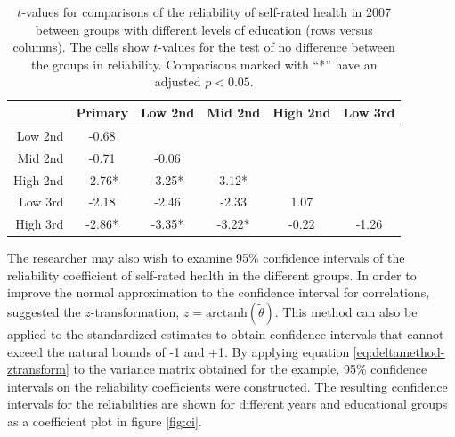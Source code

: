 \documentclass[a4paper,11pt]{article}
\newcommand{\thetastan}{\tilde{\theta}}
\newcommand{\0}{\boldsymbol{0}}
\newcommand{\arctanh}{\mathrm{arctanh}}
\begin{document}
\begin{table}[tbh]
\begin{center}
\begin{tabular}{rccccc}
  \hline
 & Primary & Low 2nd & Mid 2nd & High 2nd & Low 3rd \\
   \hline
  Low 2nd & -0.68 \\ 
  Mid 2nd & -0.71 & -0.06  \\ 
  High 2nd & -2.76* & -3.25* &3.12*   \\ 
  Low 3rd & -2.18 & -2.46 & -2.33 & 1.07   \\ 
  High 3rd & -2.86* & -3.35* & -3.22* & -0.22 & -1.26  \\ 
   \hline
\end{tabular}\caption{$t$-values for comparisons of the reliability of self-rated health in 2007 
	 between groups with different levels of education (rows versus columns). 
	  The cells show $t$-values for the test of no difference
	 between the groups in reliability. Comparisons marked with ``*'' have an adjusted $p<0.05$.}
	 \label{tab:tests}
\end{center}
\end{table}

The  researcher may also wish to examine 95\% confidence intervals of the reliability coefficient of self-rated health in the different groups.
In order to improve the normal approximation to the confidence interval for correlations, \cite{fisher1925statistical} suggested the $z$-transformation, $z = \arctanh(\thetastan)$. This method can also be applied to the standardized estimates to obtain confidence 
intervals that cannot exceed the natural bounds of -1 and +1. By applying equation \ref{eq:deltamethod-ztransform} to the variance
matrix obtained for the example, 95\% confidence intervals on the reliability coefficients were constructed. The resulting confidence
intervals for the reliabilities are shown for different years and educational groups as a coefficient plot in figure \ref{fig:ci}.
\end{document}
